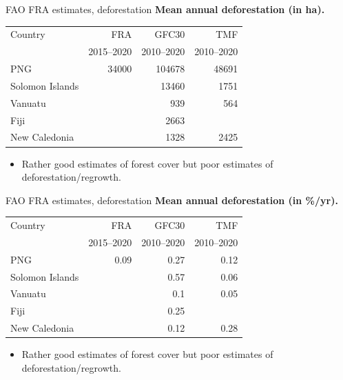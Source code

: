 \documentclass[10pt,table,dvipsnames,compress]{beamer}
\begin{document}
\begin{frame}[label={sec:orgef1cd32}]{FAO FRA estimates, deforestation}
\textbf{Mean annual deforestation (in ha).}

\begin{center}
\footnotesize
\begin{tabular}{lrrr}
Country & FRA & GFC30 & TMF\\[0pt]
 & 2015--2020 & 2010--2020 & 2010--2020\\[0pt]
\hline
PNG & 34000 & 104678 & 48691\\[0pt]
Solomon Islands &  & 13460 & 1751\\[0pt]
Vanuatu &  & 939 & 564\\[0pt]
Fiji &  & 2663 & \\[0pt]
New Caledonia &  & 1328 & 2425\\[0pt]
\end{tabular}
\end{center}

\begin{itemize}
\item Rather good estimates of forest cover but poor estimates of deforestation/regrowth.
\end{itemize}
\end{frame}

\begin{frame}[label={sec:orge5b8c23}]{FAO FRA estimates, deforestation}
\textbf{Mean annual deforestation (in \%/yr).}

\begin{center}
\footnotesize
\begin{tabular}{lrrr}
Country & FRA & GFC30 & TMF\\[0pt]
 & 2015--2020 & 2010--2020 & 2010--2020\\[0pt]
\hline
PNG & 0.09 & 0.27 & 0.12\\[0pt]
Solomon Islands &  & 0.57 & 0.06\\[0pt]
Vanuatu &  & 0.1 & 0.05\\[0pt]
Fiji &  & 0.25 & \\[0pt]
New Caledonia &  & 0.12 & 0.28\\[0pt]
\end{tabular}
\end{center}

\begin{itemize}
\item Rather good estimates of forest cover but poor estimates of deforestation/regrowth.
\end{itemize}
\end{frame}
\end{document}
